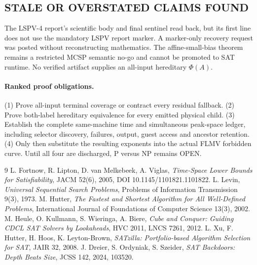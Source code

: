 \documentclass[11pt]{article}
\begin{document}
\subsection*{STALE OR OVERSTATED CLAIMS FOUND}
The LSPV-4 report's scientific body and final sentinel read back, but its first
line does not use the mandatory LSPV report marker.  A marker-only recovery
request was posted without reconstructing mathematics.  The affine-small-bias
theorem remains a restricted MCSP semantic no-go and cannot be promoted to SAT
runtime.  No verified artifact supplies an all-input hereditary $\Phi(A)$.

\paragraph{Ranked proof obligations.}
(1) Prove all-input terminal coverage or contract every residual fallback.
(2) Prove both-label hereditary equivalence for every emitted physical child.
(3) Establish the complete same-machine time and simultaneous peak-space ledger,
including selector discovery, failures, output, guest access and ancestor
retention.  (4) Only then substitute the resulting exponents into the actual
FLMV forbidden curve.  Until all four are discharged, P versus NP remains OPEN.

\begin{thebibliography}{9}
 L. Fortnow, R. Lipton, D. van Melkebeek, A. Viglas,
\emph{Time-Space Lower Bounds for Satisfiability}, JACM 52(6), 2005,
DOI 10.1145/1101821.1101822.
 L. Levin, \emph{Universal Sequential Search Problems},
Problems of Information Transmission 9(3), 1973.
 M. Hutter, \emph{The Fastest and Shortest Algorithm for All
Well-Defined Problems}, International Journal of Foundations of Computer
Science 13(3), 2002.
 M. Heule, O. Kullmann, S. Wieringa, A. Biere,
\emph{Cube and Conquer: Guiding CDCL SAT Solvers by Lookaheads}, HVC 2011,
LNCS 7261, 2012.
 L. Xu, F. Hutter, H. Hoos, K. Leyton-Brown,
\emph{SATzilla: Portfolio-based Algorithm Selection for SAT}, JAIR 32, 2008.
 J. Dreier, S. Ordyniak, S. Szeider,
\emph{SAT Backdoors: Depth Beats Size}, JCSS 142, 2024, 103520.
\end{thebibliography}
\end{document}
